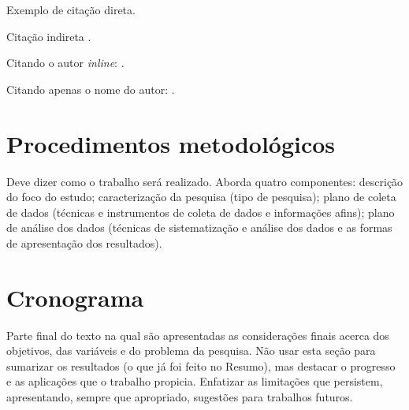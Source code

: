 \documentclass{ifto-tex}
\begin{document}
	\begin{citacao}
		Exemplo de citação direta. \cite{Brandao2016}
	\end{citacao}
	
	Citação indireta \cite{Brandao2016}.
	
	Citando o autor \textit{inline}: .
	
	Citando apenas o nome do autor: .
	
\chapter{Procedimentos metodológicos}
	
	Deve dizer como o trabalho será realizado. Aborda quatro componentes: descrição do foco do estudo; caracterização da pesquisa (tipo de pesquisa); plano de coleta de dados (técnicas e instrumentos de coleta de dados e informações afins); plano de análise dos dados (técnicas de sistematização e análise dos dados e as formas de apresentação dos resultados).

\chapter{Cronograma}

	Parte final do texto na qual são apresentadas as considerações finais acerca dos objetivos, das variáveis e do problema da pesquisa. Não usar esta seção para sumarizar os resultados (o que já foi feito no Resumo), mas destacar o progresso e as aplicações que o trabalho propicia. Enfatizar as limitações que persistem, apresentando, sempre que apropriado, sugestões para trabalhos futuros.



\postextual


\end{document}
